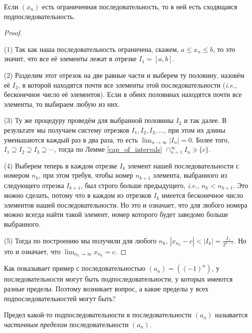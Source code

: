 \begin{theorem}\label{B-W}
    Если $(x_n)$ есть ограниченная последовательность, то в ней есть сходящаяся подпоследовательность.
\end{theorem}
\begin{proof}~

    (1) Так как наша последовательность ограничена, скажем, $a \le x_n \le b$, то это значит, что все её элементы лежат в отрезке $I_1 = [a,b]$.
    
    (2) Разделим этот отрезок на две равные части и выберем ту половину, назовём её $I_2$, в которой находятся почти все элементы этой последовательности (\textit{i.e.,} бесконечное число её элементов). Если в обеих половинах находятся почти все элементы, то выбираем любую из них.

    (3) Ту же процедуру проведём для выбранной половины $I_2$ и так далее. В результате мы получаем систему отрезков $I_1, I_2, I_3, \ldots$, при этом их длины уменьшаются каждый раз в два раза, то есть $\lim_{n \to \infty}|I_n| = 0$. Более того, $I_1 \supseteq I_2 \supseteq I_3 \supseteq \cdots$, тогда по Лемме \ref{cap_of_intervals} $\cap_{n=1}^\infty I_n \ni \{c\}.$

    (4) Выберем теперь в каждом отрезке $I_k$ элемент нашей последовательности с номером $n_k$, при этом требуя, чтобы номер $n_{k+1}$ элемента, выбранного из следующего отрезка $I_{k+1}$, был строго больше предыдущего, \textit{i.e.,} $n_k<n_{k+1}$. Это можно сделать, потому что в каждом из отрезков $I_k$ имеется бесконечное число элементов нашей последовательности. Но это и означает, что для любого номера можно всегда найти такой элемент, номер которого будет заведомо больше выбранного.

    (5) Тогда по построению мы получили для любого $n_k$, $|x_{n_k}-c| < |I_k| = \frac{I_1}{2^{k-1}}$. Но это и означает, что $\lim_{n_k \to \infty}x_{n_k} = c.$
\end{proof}

Как показывает пример с последовательностью $(a_n) =  ((-1)^n )$, у последовательности могут быть подпоследовательности, у которых имеются разные пределы. Поэтому возникает вопрос, а какие пределы у всех подпоследовательностей могут быть?

\begin{definition}
    Предел какой-то подпоследовательности в последовательности $(a_n)$ называется \textit{частичным пределом} последовательности $(a_n)$.
\end{definition}

